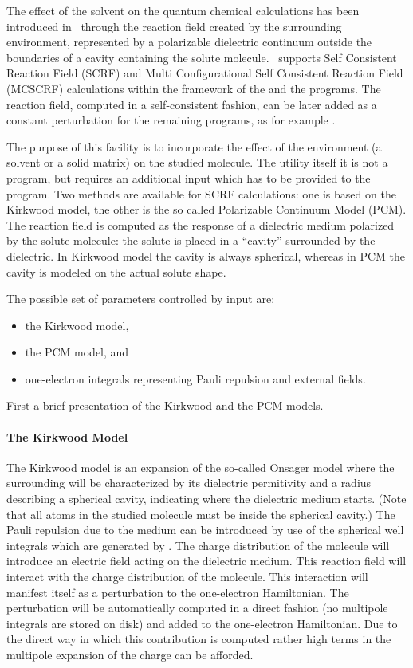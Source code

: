 The effect of the solvent on the quantum chemical calculations has been
introduced in \molcas\ through the reaction field created
by the surrounding environment, represented by a polarizable dielectric
continuum outside the boundaries of a cavity containing the solute molecule.
\molcas\ supports Self Consistent Reaction Field (SCRF) and Multi
Configurational Self Consistent Reaction Field (MCSCRF) calculations within
the framework of the  and the  programs.
The reaction field, computed in a self-consistent fashion, can be
later added as a constant perturbation for the remaining programs, as
for example .

The purpose of this facility is to incorporate
the effect of the environment (a solvent or a solid matrix) on the studied molecule.
The utility itself it is not a program, but requires
an additional input which has to be provided to the
 program.
Two methods are available for SCRF calculations: one is based on the Kirkwood
model, the other is the so called Polarizable Continuum Model (PCM).
The reaction field is computed as the response of a dielectric medium polarized
by the solute molecule: the solute is placed in a ``cavity'' surrounded by the
dielectric. In Kirkwood model the cavity is always spherical, whereas in PCM the
cavity is modeled on the actual solute shape.

The possible set of parameters controlled by input are:
\begin{itemize}
\item
the Kirkwood model,
\item
the PCM model, and
\item
one-electron integrals representing
Pauli repulsion and external fields.
\end{itemize}
First a brief presentation of the Kirkwood and the PCM models.

\paragraph{The Kirkwood Model}
The Kirkwood model is an expansion of the so-called Onsager model where
the surrounding will be characterized by its dielectric
permitivity and a radius describing a spherical cavity,
indicating where the dielectric medium starts.
(Note that all atoms in the studied molecule must be inside the spherical cavity.) The Pauli repulsion
due to the medium can be introduced by use of the spherical well
integrals which are generated by .
The charge distribution of the molecule will introduce
an electric field acting on the dielectric medium. This reaction field will interact with the
charge distribution of the molecule. This interaction will manifest itself as
a perturbation to the one-electron Hamiltonian. The perturbation will be
automatically computed in a direct fashion (no multipole integrals are stored on
disk) and added to the one-electron Hamiltonian. Due to the direct way in which
this contribution is computed rather high terms in the multipole expansion of the
charge can be afforded.

